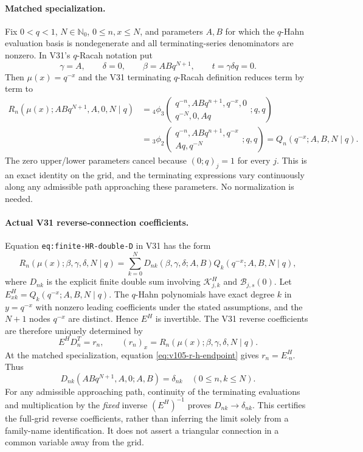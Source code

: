 \documentclass[11pt]{article}
\begin{document}
\paragraph{Matched specialization.} Fix $0<q<1$, $N\in\mathbb N_0$, $0\le n,x\le N$, and parameters $A,B$ for which the $q$-Hahn evaluation basis is nondegenerate and all terminating-series denominators are nonzero. In V31's $q$-Racah notation put
\[
 \gamma=A,\qquad \delta=0,\qquad \beta=ABq^{N+1},\qquad t=\gamma\delta q=0.
\]
Then $\mu(x)=q^{-x}$ and the V31 terminating $q$-Racah definition reduces term by term to
\begin{align}
 R_n(\mu(x);ABq^{N+1},A,0,N\mid q)
 &= {}_4\phi_3\!\left(\begin{matrix}q^{-n},ABq^{n+1},q^{-x},0\\q^{-N},0,Aq\end{matrix};q,q\right)\\
 &= {}_3\phi_2\!\left(\begin{matrix}q^{-n},ABq^{n+1},q^{-x}\\Aq,q^{-N}\end{matrix};q,q\right)
 =Q_n(q^{-x};A,B,N\mid q).
 \label{eq:v105-r-h-endpoint}
\end{align}
The zero upper/lower parameters cancel because $(0;q)_j=1$ for every $j$. This is an exact identity on the grid, and the terminating expressions vary continuously along any admissible path approaching these parameters. No normalization is needed.

\paragraph{Actual V31 reverse-connection coefficients.} Equation \texttt{eq:finite-HR-double-D} in V31 has the form
\[
 R_n(\mu(x);\beta,\gamma,\delta,N\mid q)
 =\sum_{k=0}^{N}D_{nk}(\beta,\gamma,\delta;A,B)Q_k(q^{-x};A,B,N\mid q),
\]
where $D_{nk}$ is the explicit finite double sum involving $\mathscr K^H_{j,k}$ and $\mathscr B_{j,s}(0)$. Let $E^H_{xk}=Q_k(q^{-x};A,B,N\mid q)$. The $q$-Hahn polynomials have exact degree $k$ in $y=q^{-x}$ with nonzero leading coefficients under the stated assumptions, and the $N+1$ nodes $q^{-x}$ are distinct. Hence $E^H$ is invertible. The V31 reverse coefficients are therefore uniquely determined by
\[
 E^H D_n^T=r_n,\qquad
 (r_n)_x=R_n(\mu(x);\beta,\gamma,\delta,N\mid q).
\]
At the matched specialization, equation \eqref{eq:v105-r-h-endpoint} gives $r_n=E^H_{\cdot n}$. Thus
\begin{equation}\label{eq:v105-r-h-delta}
 \boxed{D_{nk}(ABq^{N+1},A,0;A,B)=\delta_{nk}\quad(0\le n,k\le N).}
\end{equation}
For any admissible approaching path, continuity of the terminating evaluations and multiplication by the \emph{fixed} inverse $(E^H)^{-1}$ proves $D_{nk}\to\delta_{nk}$. This certifies the full-grid reverse coefficients, rather than inferring the limit solely from a family-name identification. It does not assert a triangular connection in a common variable away from the grid.
\end{document}

